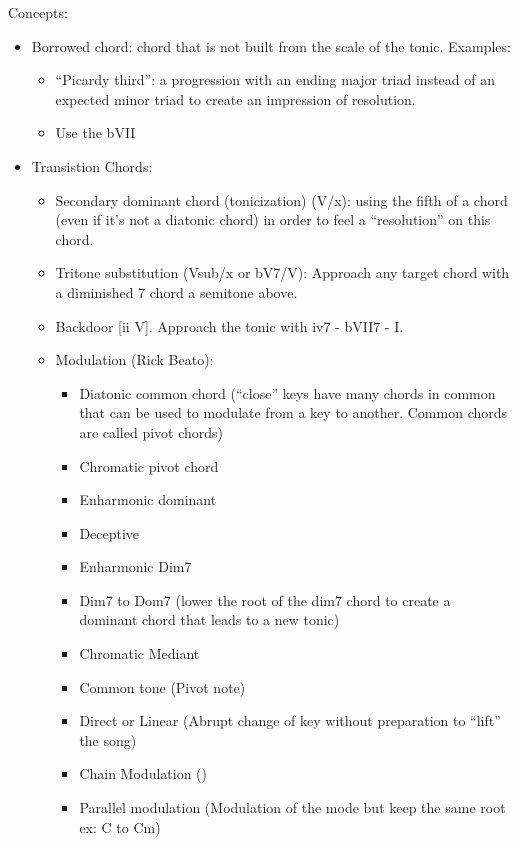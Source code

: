 \documentclass{article}
\begin{document}
Concepts: 
\begin{itemize}
	\item Borrowed chord: chord that is not built from the scale of the tonic. Examples:
	\begin{itemize}
		\item ``Picardy third'': a progression with an ending major triad instead of an expected minor triad to create an impression of resolution.
		\item Use the bVII
	\end{itemize}
	\item Transistion Chords:
	\begin{itemize}
		\item Secondary dominant chord (tonicization) (V/x): using the fifth of a chord (even if it's not a diatonic chord) in order to feel a ``resolution'' on this chord.
		\item Tritone substitution (Vsub/x or bV7/V): Approach any target chord with a diminished 7 chord a semitone above.
		\item Backdoor [ii V]. Approach the tonic with iv7 - bVII7 - I.
		\item Modulation (Rick Beato):
		\begin{itemize}
			\item Diatonic common chord (``close'' keys have many chords in common that can be used to modulate from a key to another. Common chords are called pivot chords)
			\item Chromatic pivot chord
			\item Enharmonic dominant
			\item Deceptive
			\item Enharmonic Dim7
			\item Dim7 to Dom7 (lower the root of the dim7 chord to create a dominant chord that leads to a new tonic)
			\item Chromatic Mediant
			\item Common tone (Pivot note)
			\item Direct or Linear (Abrupt change of key without preparation to ``lift'' the song)
			\item Chain Modulation ()
			\item Parallel modulation (Modulation of the mode but keep the same root ex: C to Cm)
		\end{itemize}
	\end{itemize}
\end{itemize}
\end{document}
